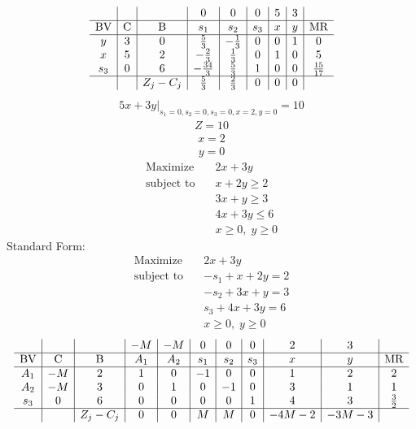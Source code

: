 \documentclass{article}
\begin{document}
\begin{align*}
\begin{array}{c|c|c|c|c|c|c|c|c}
 &  &  & 0 & 0 & 0 & 5 & 3 & \\
\hline
\text{BV} & \text{C} & \text{B} & s_{1} & s_{2} & s_{3} & x & y & \text{MR} \\
\hline
y & 3 & 0 & \frac{5}{3} & -\frac{1}{3} & 0 & 0 & 1 & 0 \\
x & 5 & 2 & -\frac{2}{3} & \frac{1}{3} & 0 & 1 & 0 & 5 \\
s_{3} & 0 & 6 & -\frac{34}{3} & \frac{5}{3} & 1 & 0 & 0 & \frac{15}{17} \\
\hline
 &  & Z_j-C_j & \frac{5}{3} & \frac{2}{3} & 0 & 0 & 0 & \\
\end{array}
\end{align*}
\begin{align*}
\left.5x + 3y\right|_{s_{1}=0,s_{2}=0,s_{3}=0,x=2,y=0}=10\end{align*}
\begin{align*}
Z=10\end{align*}
\begin{align*}
x=2\end{align*}
\begin{align*}
y=0\end{align*}
\begin{align*}
\text{Maximize} \quad & 2x + 3y\\
\text{subject to} \quad
& x + 2y\ge2\\
& 3x + y\ge3\\
& 4x + 3y\le6\\
& x\ge0,\; y\ge0\end{align*}
Standard Form:\\
\begin{align*}
\text{Maximize} \quad & 2x + 3y\\
\text{subject to} \quad
& -s_{1} + x + 2y=2\\
& -s_{2} + 3x + y=3\\
& s_{3} + 4x + 3y=6\\
& x\ge0,\; y\ge0\end{align*}
\begin{align*}
\begin{array}{c|c|c|c|c|c|c|c|c|c|c}
 &  &  & -M & -M & 0 & 0 & 0 & 2 & 3 & \\
\hline
\text{BV} & \text{C} & \text{B} & A_{1} & A_{2} & s_{1} & s_{2} & s_{3} & x & y & \text{MR} \\
\hline
A_{1} & -M & 2 & 1 & 0 & -1 & 0 & 0 & 1 & 2 & 2 \\
A_{2} & -M & 3 & 0 & 1 & 0 & -1 & 0 & 3 & 1 & 1 \\
s_{3} & 0 & 6 & 0 & 0 & 0 & 0 & 1 & 4 & 3 & \frac{3}{2} \\
\hline
 &  & Z_j-C_j & 0 & 0 & M & M & 0 & -4M - 2 & -3M - 3 & \\
\end{array}
\end{align*}
\end{document}
